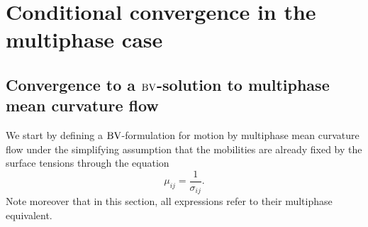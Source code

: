 \section{Conditional convergence in the multiphase case}

\subsection{Convergence to a $\operatorname{BV}$-solution to multiphase mean curvature flow}

We start by defining a $ \operatorname{BV} $-formulation for motion by multiphase mean 
curvature flow under the simplifying assumption that the mobilities are already 
fixed by the surface tensions through the equation
\begin{equation}
	\label{mobilites_inverse_of_surface_tensions}
	\mu_{ i j } =\frac{ 1 }{ \sigma_{ i j } }. 
\end{equation}
Note moreover that in this section, all expressions refer to their multiphase 
equivalent.

